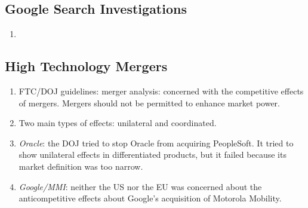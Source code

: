 \subsection{Google Search Investigations} %

\begin{enumerate}
    \item 
\end{enumerate}

\subsection{High Technology Mergers}

\begin{enumerate}
    \item FTC/DOJ guidelines: merger analysis: concerned with the competitive 
    effects of mergers. Mergers should not be permitted to enhance market 
    power.
    \item Two main types of effects: unilateral and coordinated.
    \item \emph{Oracle}: the DOJ tried to stop Oracle from acquiring 
    PeopleSoft. It tried to show unilateral effects in differentiated 
    products, but it failed because its market definition was too narrow.
    \item \emph{Google/MMI}: neither the US nor the EU was concerned about the 
    anticompetitive effects about Google's acquisition of Motorola Mobility.
\end{enumerate}
